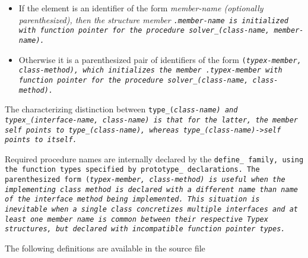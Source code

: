 \begin{itemize}

\item If the element is an identifier of the form \it{member-name}
(optionally parenthesized), then the structure member \tt{.}\it{member-name}
is initialized with function pointer for the procedure
\tt{solver_(}\it{class-name}\tt{,} \it{member-name}\tt{)}.

\item Otherwise it is a parenthesized pair of identifiers of the form
\tt{(}\it{typex-member}\tt{,} \it{class-method}\tt{)}, which initializes
the member \tt{.}\it{typex-member} with function pointer for the procedure
\tt{solver_(}\it{class-name}\tt{,} \it{class-method}\tt{)}.

\end{itemize}

The characterizing distinction between \tt{type_(}\it{class-name}\tt{)} and
\tt{typex_(}\it{interface-name}\tt{,} \it{class-name}\tt{)} is that for the
latter, the member \tt{self} points to \tt{type_(}\it{class-name}\tt{)},
whereas \tt{type_(}\it{class-name}\tt{)->self} points to itself.

\note Required procedure names are internally declared by the \tt{define_}
family, using the function types specified by \tt{prototype_} declarations.
The parenthesized form \tt{(}\it{typex-member}\tt{,} \it{class-method}\tt{)}
is useful when the implementing class method is declared with a
different name than name of the interface method being implemented.
This situation is inevitable when a single class concretizes multiple interfaces
and at least one member name is common between their respective \tt{Typex}
structures, but declared with incompatible function pointer types.

\enlargethispage*{\baselineskip}
\enlargethispage*{\baselineskip}
\enlargethispage*{\baselineskip}

\example The following definitions are available in the source file
